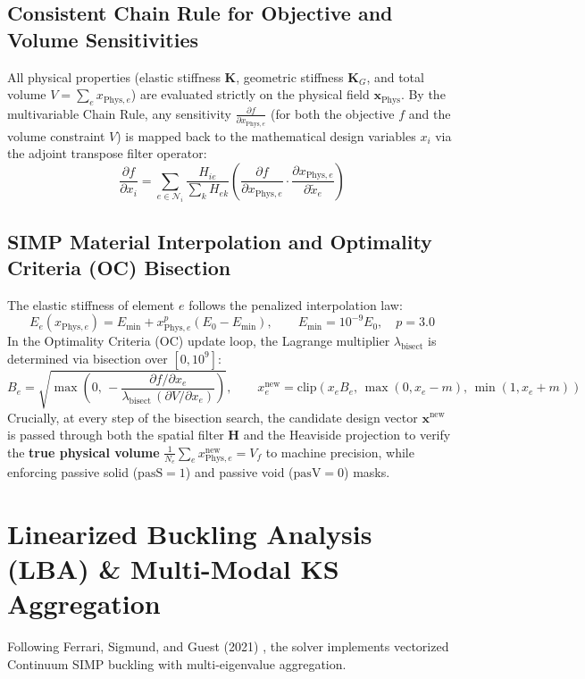 \documentclass[11pt, a4paper]{article}
\begin{document}
\subsection{Consistent Chain Rule for Objective and Volume Sensitivities}
All physical properties (elastic stiffness $\mathbf{K}$, geometric stiffness $\mathbf{K}_G$, and total volume $V = \sum_e x_{\text{Phys}, e}$) are evaluated strictly on the physical field $\mathbf{x}_{\text{Phys}}$. By the multivariable Chain Rule, any sensitivity $\frac{\partial f}{\partial x_{\text{Phys}, e}}$ (for both the objective $f$ and the volume constraint $V$) is mapped back to the mathematical design variables $x_i$ via the adjoint transpose filter operator:
\begin{equation}
    \frac{\partial f}{\partial x_i} = \sum_{e \in \mathcal{N}_i} \frac{H_{ie}}{\sum_{k} H_{ek}} \left( \frac{\partial f}{\partial x_{\text{Phys}, e}} \cdot \frac{\partial x_{\text{Phys}, e}}{\partial \tilde{x}_e} \right)
\end{equation}

\subsection{SIMP Material Interpolation and Optimality Criteria (OC) Bisection}
The elastic stiffness of element $e$ follows the penalized interpolation law:
\begin{equation}
    E_e(x_{\text{Phys}, e}) = E_{\min} + x_{\text{Phys}, e}^{p} (E_0 - E_{\min}), \qquad E_{\min} = 10^{-9} E_0, \quad p = 3.0
\end{equation}
In the Optimality Criteria (OC) update loop, the Lagrange multiplier $\lambda_{\text{bisect}}$ is determined via bisection over $[0, 10^9]$:
\begin{equation}
    B_e = \sqrt{\max\!\left(0,\, -\frac{\partial f / \partial x_e}{\lambda_{\text{bisect}} \, (\partial V / \partial x_e)}\right)}, \qquad x_e^{\text{new}} = \text{clip}\!\left(x_e B_e,\, \max(0, x_e - m),\, \min(1, x_e + m)\right)
\end{equation}
Crucially, at every step of the bisection search, the candidate design vector $\mathbf{x}^{\text{new}}$ is passed through both the spatial filter $\mathbf{H}$ and the Heaviside projection to verify the \textbf{true physical volume} $\frac{1}{N_e}\sum_e x_{\text{Phys}, e}^{\text{new}} = V_f$ to machine precision, while enforcing passive solid ($\text{pasS} = 1$) and passive void ($\text{pasV} = 0$) masks.

\section{Linearized Buckling Analysis (LBA) \& Multi-Modal KS Aggregation}
Following Ferrari, Sigmund, and Guest (2021) \cite{ferrari2021}, the solver implements vectorized Continuum SIMP buckling with multi-eigenvalue aggregation.
\end{document}
